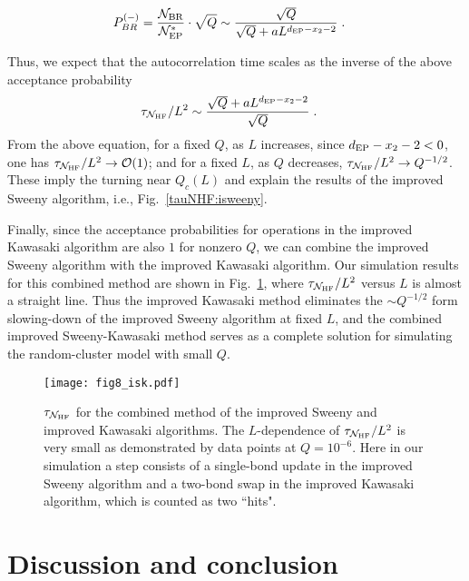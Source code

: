 \documentclass[aps,pre,twocolumn,superscriptaddress,longbibliography,floatfix]{revtex4-2}
\begin{document}
\begin{align}
    &P^{(-)}_{BR} = \frac{\mathcal{N}_{\rm BR}}{\mathcal{N}^{*}_{\rm EP}} \cdot \sqrt{Q} \sim \frac{\sqrt{Q}}{\sqrt{Q}+aL^{d_{\rm EP} - x_2 - 2}} \;.
\end{align}

Thus, we expect that the autocorrelation time scales as the inverse of the above acceptance probability 
\begin{align}
    &\tau_{\mathcal{N}_{\rm HF}}/L^2 \sim \frac{\sqrt{Q}+aL^{d_{\rm EP} - x_2 - 2}}{\sqrt{Q}} \;.
\end{align}
From the above equation, for a fixed $Q$, as $L$ increases, since $d_{\rm EP} - x_2 - 2<0$, one has $\tau_{\mathcal{N}_{\rm HF}}/L^2 \to {\cal O}(1)$; 
and for a fixed $L$, as $Q$ decreases, $\tau_{\mathcal{N}_{\rm HF}}/L^2 \to Q^{-1/2}$.
These imply the turning near $Q_c(L)$ and explain the results of the improved Sweeny algorithm, i.e., Fig.~\ref{tauNHF:isweeny}.

Finally, since the acceptance probabilities for operations in the improved Kawasaki algorithm are also $1$ for nonzero $Q$, we can combine the improved Sweeny algorithm with the improved Kawasaki algorithm. 
Our simulation results for this combined method are shown in Fig.~\ref{isk},  where $\tau_{\mathcal{N}_{\rm HF}}/L^2$ versus $L$ is almost a straight line. 
Thus the improved Kawasaki method eliminates the $\sim Q^{-1/2}$ form slowing-down of the improved Sweeny algorithm at fixed $L$, and the combined improved Sweeny-Kawasaki method serves as a complete solution for simulating the random-cluster model with small $Q$.

\begin{figure}[t] 
\centering
\texttt{[image: fig8\_isk.pdf]}
\caption{
$\tau_{\mathcal{N}_{\rm HF}}$ for the combined method of the improved Sweeny and improved Kawasaki algorithms. 
{The $L$-dependence of $\tau_{\mathcal{N}_{\rm HF}} / L^2$ is very small as demonstrated by data points at $Q=10^{-6}$. Here in our simulation a step consists of a single-bond update in the improved Sweeny algorithm and a two-bond swap in the improved Kawasaki algorithm, which is counted as two ``hits".}
}
\label{isk}
\end{figure}

\section{\label{sec:level1}Discussion and conclusion}
\end{document}
